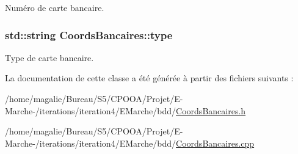 Numéro de carte bancaire. 

\hypertarget{class_coords_bancaires_ad34142224a2753ad54dddf8d537564b1}{
\subsubsection[{type}]{\setlength{\rightskip}{0pt plus 5cm}std\-::string Coords\-Bancaires\-::type\hspace{0.3cm}{\ttfamily [protected]}}}\label{class_coords_bancaires_ad34142224a2753ad54dddf8d537564b1}


Type de carte bancaire. 



La documentation de cette classe a été générée à partir des fichiers suivants \-:\begin{DoxyCompactItemize}
\item 
/home/magalie/\-Bureau/\-S5/\-C\-P\-O\-O\-A/\-Projet/\-E-\/\-Marche-\//iterations/iteration4/\-E\-Marche/bdd/\hyperlink{_coords_bancaires_8h}{Coords\-Bancaires.\-h}\item 
/home/magalie/\-Bureau/\-S5/\-C\-P\-O\-O\-A/\-Projet/\-E-\/\-Marche-\//iterations/iteration4/\-E\-Marche/bdd/\hyperlink{_coords_bancaires_8cpp}{Coords\-Bancaires.\-cpp}\end{DoxyCompactItemize}

